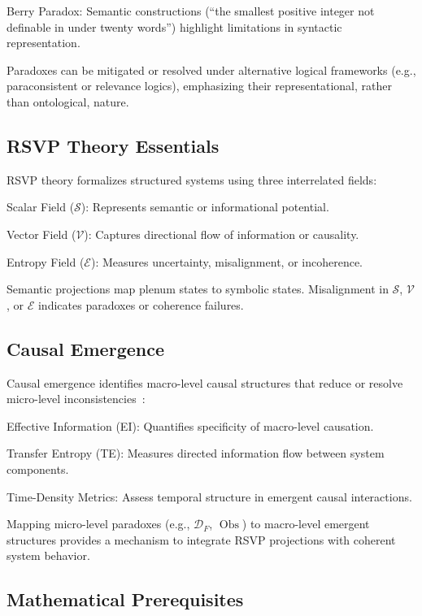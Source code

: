 \documentclass[12pt]{article}
\theoremstyle{plain}
\begin{document}
Berry Paradox: Semantic constructions (“the smallest positive integer not definable in under twenty words”) highlight limitations in syntactic representation.

Paradoxes can be mitigated or resolved under alternative logical frameworks (e.g., paraconsistent or relevance logics), emphasizing their representational, rather than ontological, nature.

\subsection{RSVP Theory Essentials}

RSVP theory formalizes structured systems using three interrelated fields:

Scalar Field (\(\mathcal{S}\)): Represents semantic or informational potential.

Vector Field (\(\mathcal{V}\)): Captures directional flow of information or causality.

Entropy Field (\(\mathcal{E}\)): Measures uncertainty, misalignment, or incoherence.

Semantic projections map plenum states to symbolic states. Misalignment in \(\mathcal{S}\), \(\mathcal{V}\), or \(\mathcal{E}\) indicates paradoxes or coherence failures.

\subsection{Causal Emergence}

Causal emergence identifies macro-level causal structures that reduce or resolve micro-level inconsistencies~\citep{Yuan2024}:

Effective Information (EI): Quantifies specificity of macro-level causation.

Transfer Entropy (TE): Measures directed information flow between system components.

Time-Density Metrics: Assess temporal structure in emergent causal interactions.

Mapping micro-level paradoxes (e.g., \(\mathcal{D}_F\), \(\operatorname{Obs}\)) to macro-level emergent structures provides a mechanism to integrate RSVP projections with coherent system behavior.

\subsection{Mathematical Prerequisites}
\end{document}
